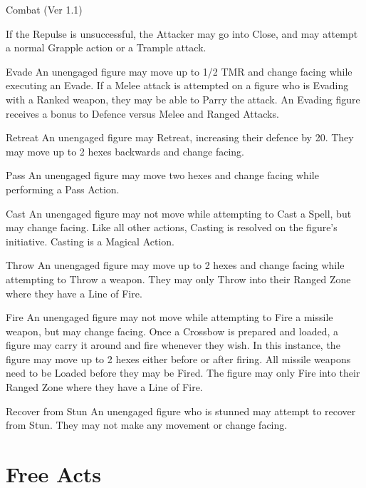 \begin{Chapter}{Combat (Ver 1.1)}
\begin{Description}
  If the Repulse is unsuccessful, the Attacker may go into Close, and
  may attempt a normal Grapple action or a Trample attack.

\item[Evade] An unengaged figure may move up to 1/2 TMR and change
  facing while executing an Evade.  If a Melee attack is attempted on
  a figure who is Evading with a Ranked weapon, they may be able to
  Parry the attack.  An Evading figure receives a bonus to Defence
  versus Melee and Ranged Attacks.

\item[Retreat] An unengaged figure may Retreat, increasing their
  defence by 20.  They may move up to 2 hexes backwards and change
  facing.

\item[Pass]An unengaged figure may move two hexes and change facing
  while performing a Pass Action.

\item[Cast] An unengaged figure may not move while attempting to Cast
  a Spell, but may change facing. Like all other actions, Casting is
  resolved on the figure’s initiative. Casting is a Magical Action.

\item[Throw] An unengaged figure may move up to 2 hexes and change
  facing while attempting to Throw a weapon.  They may only Throw into
  their Ranged Zone where they have a Line of Fire.

\item[Fire] An unengaged figure may not move while attempting to Fire
  a missile weapon, but may change facing.  Once a Crossbow is
  prepared and loaded, a figure may carry it around and fire whenever
  they wish. In this instance, the figure may move up to 2 hexes
  either before or after firing.  All missile weapons need to be
  Loaded before they may be Fired.  The figure may only Fire into
  their Ranged Zone where they have a Line of Fire.

\item[Recover from Stun] An unengaged figure who is stunned may
  attempt to recover from Stun.  They may not make any movement or
  change facing.

\end{Description}

\section{Free Acts}


\end{Chapter}
